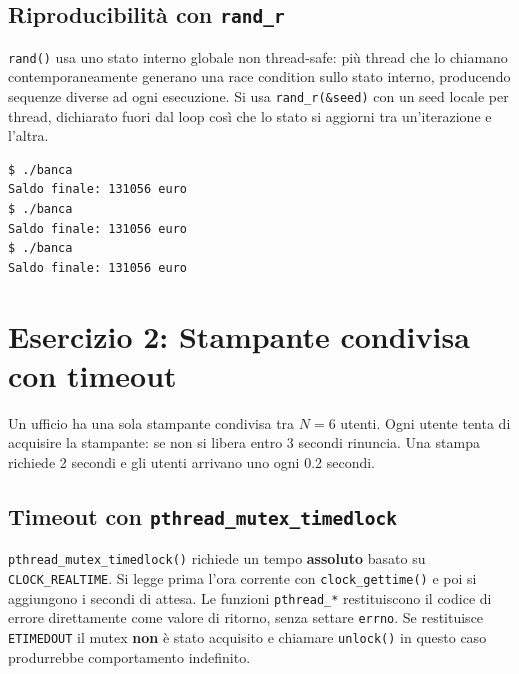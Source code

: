 \documentclass[a4paper,12pt]{article}
\begin{document}
\subsection*{Riproducibilità con \texttt{rand\_r}}

\texttt{rand()} usa uno stato interno globale non thread-safe: più thread
che lo chiamano contemporaneamente generano una race condition sullo stato
interno, producendo sequenze diverse ad ogni esecuzione.
Si usa \texttt{rand\_r(\&seed)} con un seed locale per thread, dichiarato
fuori dal loop così che lo stato si aggiorni tra un'iterazione e l'altra.

\begin{lstlisting}[language=bash, caption={Test Esercizio 1 -- risultato riproducibile}]
$ ./banca
Saldo finale: 131056 euro
$ ./banca
Saldo finale: 131056 euro
$ ./banca
Saldo finale: 131056 euro
\end{lstlisting}

\section{Esercizio 2: Stampante condivisa con timeout}

Un ufficio ha una sola stampante condivisa tra $N = 6$ utenti.
Ogni utente tenta di acquisire la stampante: se non si libera entro
3 secondi rinuncia. Una stampa richiede 2 secondi e gli utenti
arrivano uno ogni 0.2 secondi.

\subsection*{Timeout con \texttt{pthread\_mutex\_timedlock}}

\texttt{pthread\_mutex\_timedlock()} richiede un tempo \textbf{assoluto}
basato su \texttt{CLOCK\_REALTIME}. Si legge prima l'ora corrente con
\texttt{clock\_gettime()} e poi si aggiungono i secondi di attesa.
Le funzioni \texttt{pthread\_*} restituiscono il codice di errore
direttamente come valore di ritorno, senza settare \texttt{errno}.
Se restituisce \texttt{ETIMEDOUT} il mutex \textbf{non} è stato acquisito e
chiamare \texttt{unlock()} in questo caso produrrebbe comportamento indefinito.
\end{document}
